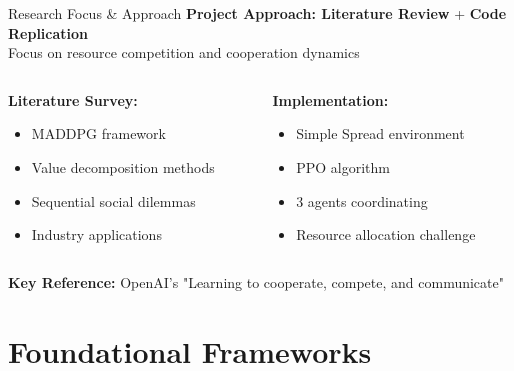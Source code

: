 \documentclass[aspectratio=169]{beamer}
\begin{document}
\begin{frame}{Research Focus \& Approach}
    \textbf{Project Approach: Literature Review} + \textbf{Code Replication} \\
    Focus on resource competition and cooperation dynamics
    \vfill
    \begin{columns}
        \begin{column}{0.5\textwidth}
            \textbf{Literature Survey:}
            \begin{itemize}
                \item MADDPG framework
                \item Value decomposition methods  
                \item Sequential social dilemmas
                \item Industry applications
            \end{itemize}
        \end{column}
        \begin{column}{0.5\textwidth}
            \textbf{Implementation:}
            \begin{itemize}
                \item Simple Spread environment
                \item PPO algorithm
                \item 3 agents coordinating
                \item Resource allocation challenge
            \end{itemize}
        \end{column}
    \end{columns}
    \vfill
    \textbf{Key Reference:} OpenAI's "Learning to cooperate, compete, and communicate" \autocite{lowe_learning_2017}
\end{frame}

\section{Foundational Frameworks}
\end{document}

